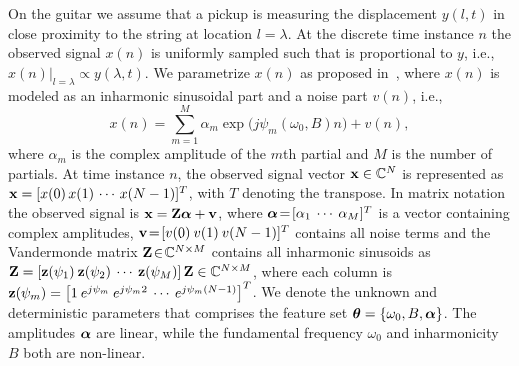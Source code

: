 \documentclass{article}
\begin{document}
\begin{sloppy}
On the guitar we assume that a pickup is measuring the displacement $y(l,t)$ in close proximity to the string at location $l\!=\!\lambda$. At the discrete time instance $n$ the observed signal $x(n)$ is uniformly sampled such that is proportional to $y$, i.e.,
     $x(n)  \vert_{l=\lambda} \propto y(\lambda, t).$
We parametrize $x(n)$ as proposed in~\cite{hjerrild::icassp19}, where $x(n)$ is modeled as an inharmonic sinusoidal part and a noise part $v(n)$, i.e.,  
\begin{equation}\label{eq:sigmod1}
  x(n)\! =  \!\sum\limits_{m=1}^{M}\!\! \alpha_{m} \exp\big({j\psi_m(\omega_0,B) n}\big)+v(n),
\end{equation}
where $\alpha_{m}$ is the complex amplitude of the $m$th partial and $M$ is the number of partials.
%
 At time instance $n$, the observed signal vector $\mathbf x \in \mathbb{C}^N$ is represented as $\mathbf x = [x(0) \, x(1) \, \cdots \, x(N-1)]^T$, with $T$ denoting the transpose. 
In matrix notation the observed signal is
$  \mathbf x = \mathbf{Z} \text{\boldmath$\alpha$} + \mathbf v$, 
where $\text{\boldmath$\alpha$}\!=\! [\alpha_1 \: \cdots \: \alpha_M]^T$ is a vector containing complex amplitudes, $\mathbf v\! =\! [v(0) \: v(1) \: v(N-1)]^T$ contains all noise terms and the Vandermonde matrix $\mathbf{Z}\! \in\! \mathbb{C}^{N\times M}$ contains all inharmonic sinusoids as $\mathbf{Z} = \left[ \mathbf z(\psi_1) \: \mathbf z(\psi_2) \: \cdots \: \mathbf z(\psi_M)\right] \mathbf{Z} \in \mathbb{C}^{N\times M}$, where each column is $\mathbf z(\psi_m) = \left[ 1 \: e^{j\psi_m} \: e^{j\psi_m2} \: \cdots \: e^{j\psi_m(N-1)} \right]^{T}$.
We denote the unknown and deterministic parameters that comprises the feature set 
  $\text{\boldmath$\theta$} = \{\omega_0, B, \text{\boldmath$\alpha$}\}$.
The amplitudes $\text{\boldmath$\alpha$}$ are linear, while the fundamental frequency $\omega_0$ and inharmonicity $B$ both are non-linear. 
%
%
%

\end{sloppy}
\end{document}
